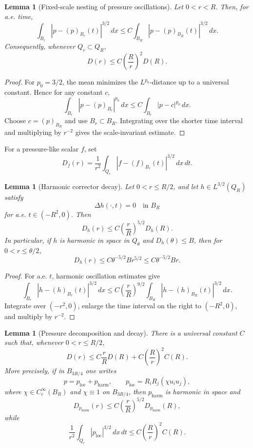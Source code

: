 \documentclass[pdflatex,sn-mathphys-num]{sn-jnl}
\numberwithin{equation}{section}
\theoremstyle{thmstyleone}
\newtheorem{lemma}[theorem]{Lemma}
\theoremstyle{thmstylethree}
\newcommand{\dx}{\,dx}
\newcommand{\dxdt}{\,dx\,dt}
\newcommand{\harm}{\mathrm{harm}}
\newcommand{\locp}{\mathrm{loc}}
\begin{document}
\begin{lemma}[Fixed-scale nesting of pressure oscillations]
\label{lem:pressure-nesting}
Let \(0<r<R\).  Then, for a.e. time,
\[
        \int_{B_r}|p-(p)_{B_r}(t)|^{3/2}\dx
        \le C\int_{B_R}|p-(p)_{B_R}(t)|^{3/2}\dx.
\]
Consequently, whenever \(Q_r\subset Q_R\),
\[
        D(r)\le C\left(\frac Rr\right)^2D(R).
\]
\end{lemma}

\begin{proof}
For \(p_0=3/2\), the mean minimizes the \(L^{p_0}\)-distance up to a universal constant.  Hence for any constant \(c\),
\[
        \int_{B_r}|p-(p)_{B_r}|^{p_0}\dx
        \le C\int_{B_r}|p-c|^{p_0}\dx.
\]
Choose \(c=(p)_{B_R}\) and use \(B_r\subset B_R\).  Integrating over the shorter time interval and multiplying by \(r^{-2}\) gives the scale-invariant estimate.
\end{proof}

For a pressure-like scalar \(f\), set
\[
        D_f(r)=\frac1{r^2}\int_{Q_r}|f-(f)_{B_r}(t)|^{3/2}\dxdt.
\]

\begin{lemma}[Harmonic corrector decay]
\label{lem:harmonic-decay}
Let \(0<r\le R/2\), and let \(h\in L^{3/2}(Q_R)\) satisfy
\[
        \Delta h(\cdot,t)=0\quad\text{in }B_R
\]
for a.e. \(t\in(-R^2,0)\).  Then
\[
        D_h(r)\le C\left(\frac rR\right)^{5/2}D_h(R).
\]
In particular, if \(h\) is harmonic in space in \(Q_\theta\) and \(D_h(\theta)\le B\), then for \(0<r\le\theta/2\),
\[
        D_h(r)\le C\theta^{-5/2}Br^{5/2}\le C\theta^{-5/2}Br.
\]
\end{lemma}

\begin{proof}
For a.e. \(t\), harmonic oscillation estimates give
\[
        \int_{B_r}|h-(h)_{B_r}(t)|^{3/2}\dx
        \le C\left(\frac rR\right)^{9/2}
        \int_{B_R}|h-(h)_{B_R}(t)|^{3/2}\dx.
\]
Integrate over \((-r^2,0)\), enlarge the time interval on the right to \((-R^2,0)\), and multiply by \(r^{-2}\).
\end{proof}

\begin{lemma}[Pressure decomposition and decay]
\label{lem:pressure-decomp}
There is a universal constant \(C\) such that, whenever \(0<r\le R/2\),
\begin{equation}
        D(r)\le C\frac rR D(R)+C\left(\frac Rr\right)^2C(R).
        \label{eq:pressure-decay}
\end{equation}
More precisely, if in \(B_{3R/4}\) one writes
\[
        p=p_{\locp}+p_{\harm},
        \qquad
        p_{\locp}=R_iR_j(\chi u_i u_j),
\]
where \(\chi\in C_c^\infty(B_R)\) and \(\chi\equiv1\) on \(B_{3R/4}\), then \(p_{\harm}\) is harmonic in space and
\[
        D_{p_{\harm}}(r)
        \le C\left(\frac rR\right)^{5/2}D_{p_{\harm}}(R),
\]
while
\[
        \frac1{r^2}\int_{Q_r}|p_{\locp}|^{3/2}\dxdt
        \le C\left(\frac Rr\right)^2 C(R).
\]
\end{lemma}
\end{document}
